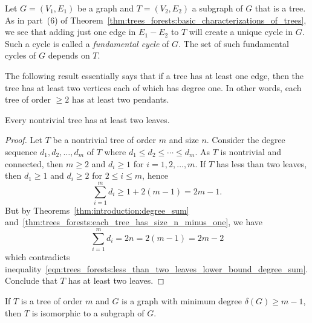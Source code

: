 Let $G = (V_1, E_1)$ be a graph and $T = (V_2, E_2)$ a subgraph of $G$
that is a tree. As in part~(6) of
Theorem~\ref{thm:trees_forests:basic_characterizations_of_trees}, we
see that adding just one edge in $E_1 - E_2$ to $T$ will create a
unique cycle in $G$. Such a cycle is called a
\emph{fundamental cycle} of $G$. The set of
such fundamental cycles of $G$ depends on $T$.

The following result essentially says that if a tree has at least one
edge, then the tree has at least two vertices each of which has degree
one. In other words, each tree of order $\geq 2$ has at least two
pendants.

\begin{theorem}
Every nontrivial tree has at least two leaves.
\end{theorem}

\begin{proof}
Let $T$ be a nontrivial tree of order $m$ and size $n$. Consider the
degree sequence $d_1, d_2, \dots, d_m$ of $T$
where $d_1 \leq d_2 \leq \cdots \leq d_m$. As $T$ is nontrivial and
connected, then $m \geq 2$ and $d_i \geq 1$ for $i = 1, 2, \dots, m$.
If $T$ has less than two leaves, then $d_1 \geq 1$ and $d_i \geq 2$
for $2 \leq i \leq m$, hence
\begin{equation}
\label{eqn:trees_forests:less_than_two_leaves_lower_bound_degree_sum}
\sum_{i=1}^m d_i
\geq
1 + 2(m-1)
=
2m - 1.
\end{equation}
But by Theorems~\ref{thm:introduction:degree_sum}
and~\ref{thm:trees_forests:each_tree_has_size_n_minus_one}, we have
\[
\sum_{i=1}^m d_i
=
2n
=
2(m - 1)
=
2m - 2
\]
which contradicts
inequality~\eqref{eqn:trees_forests:less_than_two_leaves_lower_bound_degree_sum}.
Conclude that $T$ has at least two leaves.
\end{proof}

\begin{theorem}
If $T$ is a tree of order $m$ and $G$ is a graph with
minimum degree $\delta(G) \geq m - 1$, then $T$
is isomorphic to a subgraph of $G$.
\end{theorem}

